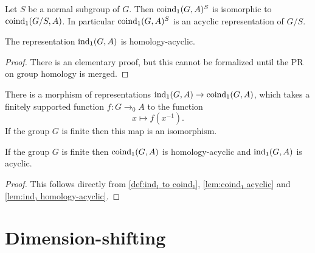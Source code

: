 \begin{lemma}	\label{lem:coind₁ invariants}
	\leanok
	Let $S$ be a normal subgroup of $G$. Then $\mathrm{coind}_1(G,A)^S$ is isomorphic to $\mathrm{coind}_1(G/S,A)$.
	In particular $\mathrm{coind}_1(G,A)^S$ is an acyclic representation of $G/S$.
\end{lemma}

\begin{lemma}	\label{lem:ind₁ homology-acyclic}
	\leanok
	The representation $\mathrm{ind}_1(G,A)$ is homology-acyclic.
\end{lemma}

\begin{proof}
	There is an elementary proof, but this cannot be formalized until
	the PR on group homology is merged.
\end{proof}

\begin{definition} \label{def:ind₁ to coind₁}
	\leanok
	There is a morphism of representations $\mathrm{ind}_1(G,A) \to \mathrm{coind}_1(G,A)$,
	which takes a finitely supported function $f : G \to_0 A$ to the function
	\[
		x \mapsto f(x^{-1}).
	\]
	If the group $G$ is finite then this map is an isomorphism.
\end{definition}

\begin{corollary}	\label{cor:coind₁ homology-acyclic}
	If the group $G$ is finite then $\mathrm{coind}_1(G,A)$ is homology-acyclic
	and $\mathrm{ind}_1(G,A)$ is acyclic.
\end{corollary}

\begin{proof}
	This follows directly from \ref{def:ind₁ to coind₁},	\ref{lem:coind₁ acyclic}
		and \ref{lem:ind₁ homology-acyclic}.
	\leanok
\end{proof}


\section{Dimension-shifting}


